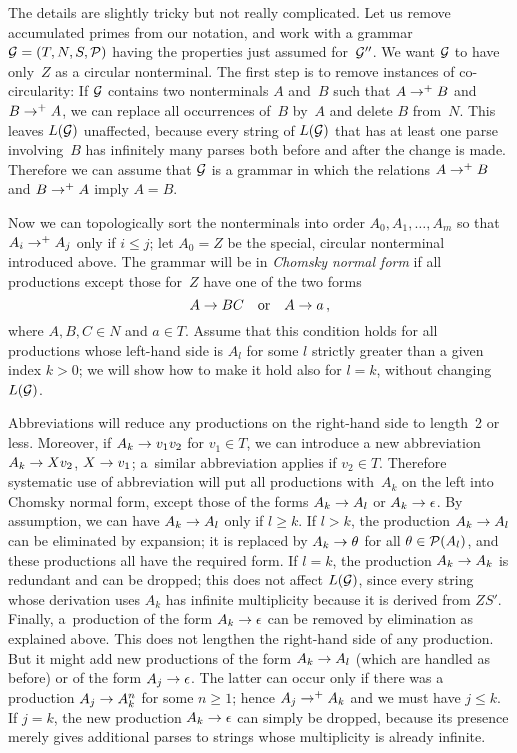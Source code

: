 The details are slightly tricky but not really complicated. Let us
remove accumulated primes from our notation, and work with a
grammar~${\cal G}=(T,N,S,{\cal P})$ having the properties just assumed
for~${\cal G}''$. We want ${\cal G}$ to have only~$Z$ as a circular
nonterminal.
The first step is to remove instances of co-circularity: If ${\cal G}$
contains two nonterminals $A$ and~$B$ such that $A\rightarrow^+ B$ and $B\rightarrow^+
A$, we can replace all occurrences of~$B$ by~$A$ and delete $B$
from~$N$. This leaves $L({\cal G})$ unaffected, because every string
of $L({\cal G})$ that has at least one parse involving~$B$ has
infinitely many parses both before and after the change is made.
Therefore we can assume that ${\cal G}$ is a grammar in which
the relations $A\rightarrow^+B$ and $B\rightarrow^+A$
imply $A=B$. 

Now we can topologically sort the nonterminals into order
$A_0,A_1,\ldots,A_m$ so that $A_i\rightarrow^+A_j$ only if $i\leq j$; let
$A_0=Z$ be the special, circular nonterminal introduced above. The
grammar will be in {\it Chomsky normal form\/} if all productions
except those for~$Z$ have one of the two forms
$$A\rightarrow BC\quad{\rm or}\quad A\rightarrow a\,,$$
where $A,B,C\in N$ and $a\in T$. Assume that this condition
holds for all productions whose left-hand side is $A_l$ for some $l$
strictly greater than a given
 index $k>0$; we will show how to make it hold also
for $l=k$, without changing $L({\cal G})$.

Abbreviations will reduce any productions on the right-hand side to
length~2 or less. Moreover, if $A_k\rightarrow v_1v_2$ for $v_1\in T$, we can
introduce a new abbreviation $A_k\rightarrow Xv_2$,
$X\rightarrow v_1$; a~similar abbreviation applies if $v_2\in T$. Therefore
systematic use of abbreviation will put all productions with~$A_k$ on
the left into Chomsky normal form, except those of the forms $A_k\rightarrow
A_l$ or $A_k\rightarrow\epsilon$. By assumption, we can have $A_k\rightarrow A_l$ only
if $l\geq k$. If $l>k$, the production $A_k\rightarrow A_l$ can be eliminated
by expansion; it is replaced by $A_k\rightarrow\theta$ for all $\theta\in{\cal
P}(A_l)$, and these productions all have the required form. If $l=k$,
the production $A_k\rightarrow A_k$ is redundant and can be dropped; this does
not affect $L({\cal G})$, since every string whose derivation uses
$A_k$ has infinite multiplicity because it is derived from $ZS'$.
Finally, a~production of the form $A_k\rightarrow\epsilon$ can be removed by
 elimination as explained above. This does not lengthen the
right-hand side of any production. But it might add new productions of
the form $A_k\rightarrow A_l$ (which are handled as before) or of the form
$A_j\rightarrow\epsilon$. The latter can occur only if there was a production
$A_j\rightarrow A^n_k$ for some $n\geq 1$; hence 
$A_j\rightarrow^+A_k$ and we must have $j\leq k$. If $j=k$, the new production
$A_k\rightarrow\epsilon$ can simply be dropped, because its presence merely
gives additional parses to strings whose multiplicity is already
infinite.

